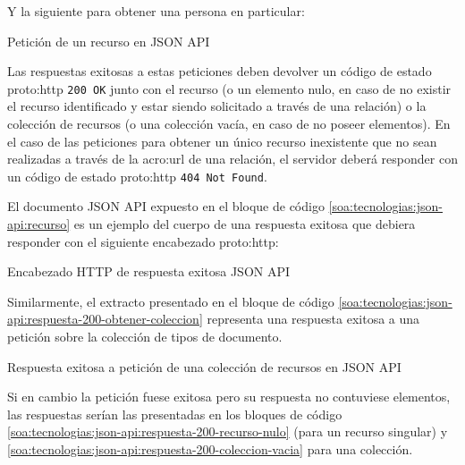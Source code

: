 Y la siguiente para obtener una persona en particular:

\begin{listing}[H]
  \caption{Petición de un recurso en JSON API}
  \label{soa:tecnologias:json-api:obtener-recurso}
\end{listing}

Las respuestas exitosas a estas peticiones deben devolver un código de estado \gls{proto:http} \texttt{200 OK} junto con el recurso (o un elemento nulo, en caso de no existir el recurso identificado y estar siendo solicitado a través de una relación) o la colección de recursos (o una colección vacía, en caso de no poseer elementos). En el caso de las peticiones para obtener un único recurso inexistente que no sean realizadas a través de la \gls{acro:url} de una relación, el servidor deberá responder con un código de estado \gls{proto:http} \texttt{404 Not Found}.

El documento JSON API expuesto en el bloque de código \autoref{soa:tecnologias:json-api:recurso} es un ejemplo del cuerpo de una respuesta exitosa que debiera responder con el siguiente encabezado \gls{proto:http}:

\begin{listing}[H]
  \caption{Encabezado HTTP de respuesta exitosa JSON API}
  \label{soa:tecnologias:json-api:respuesta-200-ok}
\end{listing}

Similarmente, el extracto presentado en el bloque de código \autoref{soa:tecnologias:json-api:respuesta-200-obtener-coleccion} representa una respuesta exitosa a una petición sobre la colección de tipos de documento.

\begin{listing}
  \caption{Respuesta exitosa a petición de una colección de recursos en JSON API}
  \label{soa:tecnologias:json-api:respuesta-200-obtener-coleccion}
\end{listing}

Si en cambio la petición fuese exitosa pero su respuesta no contuviese elementos, las respuestas serían las presentadas en los bloques de código \autoref{soa:tecnologias:json-api:respuesta-200-recurso-nulo} (para un recurso singular) y \autoref{soa:tecnologias:json-api:respuesta-200-coleccion-vacia} para una colección.

